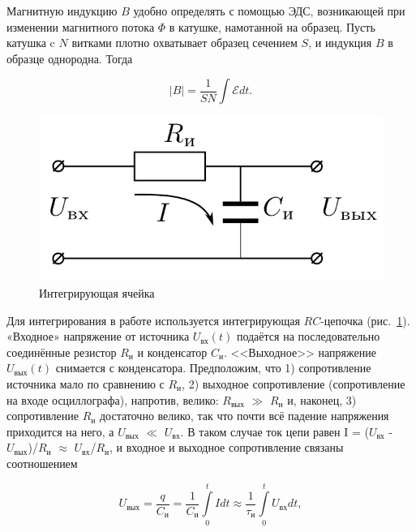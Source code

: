 \documentclass[a4paper, 12pt]{article}
\begin{document}
Магнитную индукцию $ B $ удобно определять с помощью ЭДС, возникающей при изменении магнитного потока $ \Phi $ в катушке, намотанной на образец. Пусть катушка c $ N $ витками плотно охватывает образец сечением $ S $, и индукция $ B $ в образце однородна. Тогда

\begin{equation}
|B|=\frac{1}{SN}\int\mathcal{E} dt.
\label{eq:|B|}
\end{equation}

\begin{figure}
	\includegraphics[width=\linewidth]{2.png}
	\caption{Интегрирующая ячейка}
	\label{fig:int}
\end{figure}

Для интегрирования в работе используется интегрирующая $ RC $-цепочка (рис.~\ref{fig:int}). «Входное» напряжение от источника $U_{\text{вх}}(t)$ подаётся на последовательно соединённые резистор $R_\text{и}$ и конденсатор $C_\text{и}$. <<Выходное>> напряжение $U_{\text{вых}}(t)$ снимается с конденсатора. Предположим, что 1) сопротивление источника мало по сравнению с $R_\text{и}$, 2) выходное сопротивление (сопротивление на входе осциллографа), напротив, велико: $R_{\text{вых}}$ $ \gg $ $R_\text{и}$ и, наконец, 3) сопротивление $R_\text{и}$ достаточно велико, так что почти всё падение напряжения приходится на него, а $U_{\text{вых}}$ $\ll$ $U_{\text{вх}}$. В таком случае ток цепи равен I = ($U_{\text{вх}}$ - $U_{\text{вых}}$)/$R_\text{и}$ $\approx$ $U_{\text{вх}}$/$R_\text{и}$, и входное и выходное сопротивление связаны соотношением

\begin{equation}
    U_{\text{вых}} = \frac{q}{C_\text{и}} = \frac{1}{C_\text{и}}\int\limits_0^t Idt \approx \frac{1}{\tau_\text{и}} \int\limits_0^t U_{\text{вх}}dt,
\label{eq:U_ext}
\end{equation}
\end{document}
